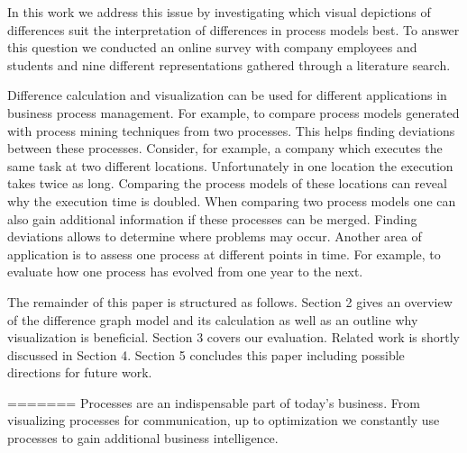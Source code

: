 \documentclass{llncs}
\begin{document}
\begin{keywords}
In this work we address this issue by investigating which visual depictions of differences suit the interpretation of differences in process models best. To answer this question we conducted an online survey with company employees and students and nine different representations gathered through a literature search.

Difference calculation and visualization can be used for different applications in business process management. For example, to compare process models generated with process mining techniques from two processes. This helps finding deviations between these processes. Consider, for example, a company which executes the same task at two different locations. Unfortunately in one location the execution takes twice as long. Comparing the process models of these locations can reveal why the execution time is doubled. When comparing two process models one can also gain additional information if these processes can be merged. Finding deviations allows to determine where problems may occur. Another area of application is to assess one process at different points in time. For example, to evaluate how one process has evolved from one year to the next. 

The remainder of this paper is structured as follows. Section 2 gives an overview of the difference graph model and its calculation as well as an outline why visualization is beneficial. Section 3 covers our evaluation. Related work is shortly discussed in Section 4. Section 5 concludes this paper including possible directions for future work.


=======
Processes are an indispensable part of today’s business. From visualizing processes for communication, up to optimization we constantly use processes to gain additional business intelligence.


\end{keywords}
\end{document}
